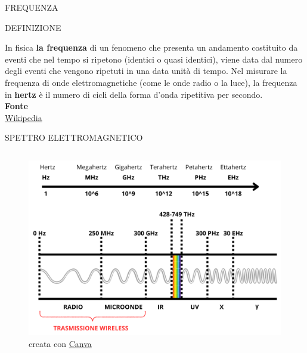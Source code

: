 \documentclass[aspectratio=1610]{beamer}
\begin{document}
\begin{frame}{FREQUENZA}
    \begin{alertblock}{DEFINIZIONE}
        \begin{minipage}{0.98\linewidth}
            \justifying
            In fisica \textbf{la frequenza} di un fenomeno che presenta un andamento costituito da 
            eventi che nel tempo si ripetono (identici o quasi identici), viene data dal numero 
            degli eventi che vengono ripetuti in una data unità di tempo. Nel misurare la frequenza 
            di onde elettromagnetiche (come le onde radio o la luce), la frequenza in \textbf{hertz} è il numero 
            di cicli della forma d'onda ripetitiva per secondo.\\
            \bigskip
            \tiny{\textbf{Fonte}}\\
            \tiny{\href{https://it.wikipedia.org/wiki/Frequenza}{Wikipedia}}
        \end{minipage}
    \end{alertblock}
\end{frame}

\begin{frame}{SPETTRO ELETTROMAGNETICO}
    \begin{columns}
        \begin{figure}
            \includegraphics[width=\textwidth]{img/Spettro_Elettromagnetico.png}
            \caption{{creata con \href{https://www.canva.com/}{Canva}}}
        \end{figure}
    \end{columns}
\end{frame}
\end{document}
